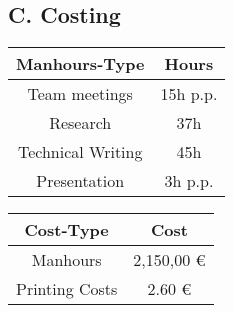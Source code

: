 \subsection{C. Costing}

\begin{table}[H]
\centering
\begin{tabular}{cc}
\toprule
Manhours-Type & Hours \\
\midrule
Team meetings & 15h p.p. \\
Research & 37h \\
Technical Writing & 45h \\
Presentation & 3h p.p. \\
\bottomrule
\end{tabular}
\end{table}

\begin{table}[H]
\centering
\begin{tabular}{cc}
\toprule
Cost-Type & Cost \\
\midrule
Manhours & 2,150,00 €\\
Printing Costs & 2.60 €\\
\bottomrule
\end{tabular}
\end{table}